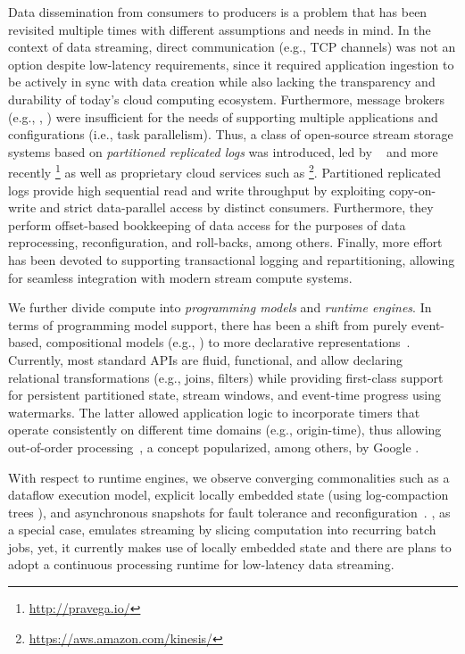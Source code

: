 Data dissemination from consumers to producers is a problem that has been revisited multiple times with different assumptions and needs in mind. In the context of data streaming, direct communication (e.g., TCP channels) was not an option despite low-latency requirements, since it required application ingestion to be actively in sync with data creation while also lacking the transparency and durability of today's cloud computing ecosystem. Furthermore, message brokers (e.g., , ) were insufficient for the needs of supporting multiple applications and configurations (i.e., task parallelism). Thus, a class of open-source stream storage systems based on \emph{partitioned replicated logs} was introduced, led by ~\cite{kreps2011kafka} and more recently \footnote{\url{http://pravega.io/}} as well as proprietary cloud services such as \footnote{\url{https://aws.amazon.com/kinesis/}}. Partitioned replicated logs provide high sequential read and write throughput by exploiting copy-on-write and strict data-parallel access by distinct consumers. Furthermore, they perform offset-based bookkeeping of data access for the purposes of data reprocessing, reconfiguration, and roll-backs, among others. Finally, more effort has been devoted to supporting transactional logging and repartitioning, allowing for seamless integration with modern stream compute systems.

 We further divide compute into \emph{programming models} and \emph{runtime engines}. In terms of programming model support, there has been a shift from purely event-based, compositional models (e.g.,  \cite{toshniwal_et_al_2014}) to more declarative representations~\cite{akidau2015dataflow,carbone_et_al_2015,zaharia_et_al_2013}. Currently, most standard APIs are fluid, functional, and allow declaring relational transformations (e.g., joins, filters) while providing first-class support for persistent partitioned state, stream windows, and event-time prog\-ress using watermarks. The latter allowed application logic to incorporate timers that operate consistently on different time domains (e.g., origin-time), thus allowing out-of-order processing~\cite{li2008out},  a concept popularized, among others, by Google \cite{millwheel,akidau2015dataflow}.

With respect to runtime engines, we observe converging commonalities
such as a dataflow execution model, explicit locally embedded state
(using log-compaction trees \cite{CUSTOM:web/rocksdb}), and
asynchronous snapshots for fault tolerance and
reconfiguration~\cite{state2017carbone,jacques2016consistent}.  \cite{zaharia_et_al_2013}, as a special case, emulates
streaming by slicing computation into recurring batch jobs, yet, it
currently makes use of locally embedded state and there are plans to
adopt a continuous processing runtime for low-latency data streaming.


